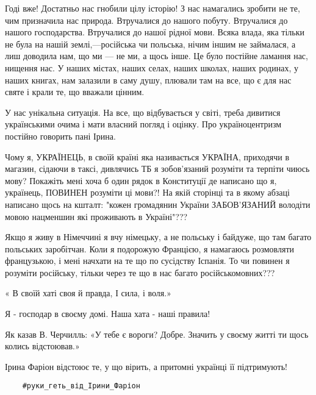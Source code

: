 Годі вже! Достатньо нас гнобили цілу історію! З нас намагались зробити не те,
чим призначила нас природа. Втручалися до нашого побуту. Втручалися до нашого
господарства. Втручалися до нашої рідної мови. Всяка влада, яка тільки не була
на нашій землі,—російська чи польська, нічим іншим не займалася, а лиш доводила
нам, що ми — не ми, а щось інше. Це було постійне ламання нас, нищення нас. У
наших містах, наших селах, наших школах, наших родинах, у наших книгах, нам
залазили в саму душу, плювали там на все, що є для нас святе і крали те, що
вважали цінним.

У нас унікальна ситуація. На все, що відбувається у світі, треба дивитися
українськими очима і мати власний погляд і оцінку. Про україноцентризм постійно
говорить пані Ірина.

Чому я, УКРАЇНЕЦЬ, в своїй країні яка називається УКРАЇНА, приходячи в магазин,
сідаючи в таксі, дивлячись ТБ я зобов'язаний розуміти та терпіти чиюсь мову?
Покажіть мені хоча б один рядок в Конституції де написано що я, українець,
ПОВИНЕН розуміти ці мови?! На якій сторінці та в якому абзаці написано щось на
кшталт: "кожен громадянин України ЗАБОВ'ЯЗАНИЙ володіти мовою нацменшин які
проживають в Україні"???

Якщо я живу в Німеччині я вчу німецьку, а не польську і байдуже, що там багато
польських заробітчан. Коли я подорожую Францією, я намагаюсь розмовляти
французькою, і мені начхати на те що по сусідству Іспанія. То чи повинен я
розуміти російську, тільки через те що в нас багато російськомовних???  

« В своїй хаті своя й правда,
І сила, і воля.» 

Я - господар в своєму домі. Наша хата - наші правила! 

Як казав В. Черчилль:  «У тебе є вороги? Добре. Значить у своєму житті ти щось колись відстоював.»  

Ірина Фаріон відстоює те, у що вірить, а притомні українці її підтримують!

\begin{verbatim}
	#руки_геть_від_Ірини_Фаріон
\end{verbatim}
